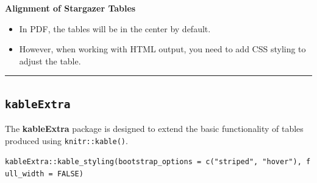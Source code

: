 \documentclass[
  a4paper,
  twoside,
  openright]{book}
\theoremstyle{definition}
\theoremstyle{definition}
\theoremstyle{definition}
\theoremstyle{definition}
\theoremstyle{remark}
\begin{document}
\textbf{Alignment of Stargazer Tables}

\begin{itemize}
\item
  In PDF, the tables will be in the center by default.
\item
  However, when working with HTML output, you need to add CSS styling to adjust the table.
\end{itemize}

\begin{center}\rule{0.5\linewidth}{0.5pt}\end{center}

\subsection{\texorpdfstring{\texttt{kableExtra}}{kableExtra}}\label{kableextra}

The \textbf{kableExtra} package is designed to extend the basic functionality of tables produced using \texttt{knitr::kable()}.

\texttt{kableExtra::kable\_styling(bootstrap\_options\ =\ c("striped",\ "hover"),\ full\_width\ =\ FALSE)}
\end{document}
